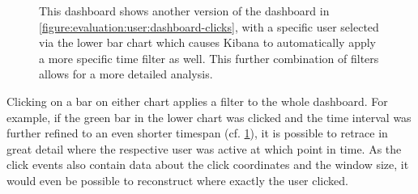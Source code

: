 \begin{figure}[t]
        \caption[Click dashboard with a more specific time filter and a specific user.]{
        This dashboard shows another version of the dashboard in \cref{figure:evaluation:user:dashboard-clicks}, with a specific user selected via the lower bar chart which causes Kibana to automatically apply a more specific time filter as well.
	This further combination of filters allows for a more detailed analysis.
        }
        \label{figure:evaluation:user:dashboard-clicks-zoom-user}
\end{figure}

Clicking on a bar on either chart applies a filter to the whole dashboard.
For example, if the green bar in the lower chart was clicked and the time interval was further refined to an even shorter timespan (cf. \cref{figure:evaluation:user:dashboard-clicks-zoom-user}), it is possible to retrace in great detail where the respective user was active at which point in time.
As the click events also contain data about the click coordinates and the window size, it would even be possible to reconstruct where exactly the user clicked.

